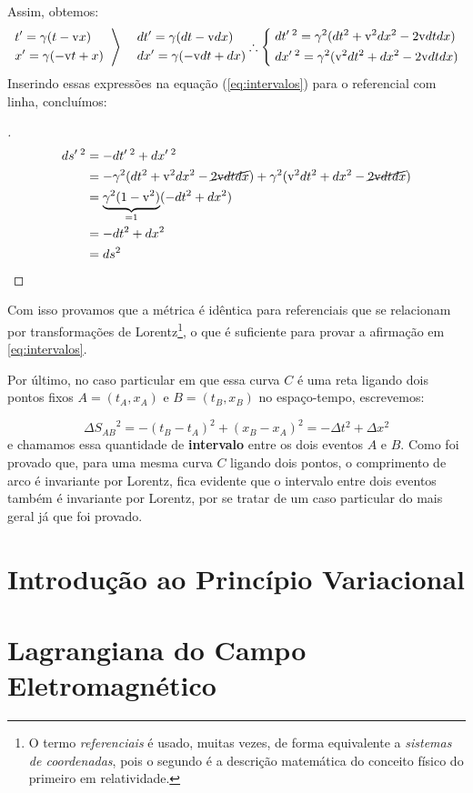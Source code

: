 \documentclass[12pt,a4paper]{article}
\begin{document}
Assim, obtemos:
\[
  \left.
  \begin{aligned}
    &   t' = \gamma(t - \mathrm{v}x) \\
    &   x' = \gamma(-\mathrm{v}t + x) 
  \end{aligned}\;\;
  \right\rangle\;\;\;\;
  \begin{aligned}
    & dt' = \gamma(dt - \mathrm{v}dx)\\
    & dx' = \gamma(-\mathrm{v}dt +dx)
  \end{aligned}\\\\
  \therefore 
  \left\{\;
  \begin{aligned}
    & dt^{\prime\;2} = \gamma^2(dt^2 + \mathrm{v}^2dx^2 - 2\mathrm{v}dtdx)\\
    & dx^{\prime\;2} = \gamma^2(\mathrm{v}^2dt^2 + dx^2 - 2\mathrm{v}dtdx)
  \end{aligned}\right.
\]
Inserindo essas expressões na equação (\ref{eq:intervalos}) para o referencial com linha, concluímos:
\begin{proof}[]
  \begin{align}
    ds^{\prime\; 2} &= -dt^{\prime\; 2} + dx^{\prime\; 2} \nonumber \\
    &= -\gamma^2(dt^2 + \mathrm{v}^2dx^2 - \cancel{2\mathrm{v}dtdx}) + \gamma^2(\mathrm{v}^2dt^2 + dx^2 - \cancel{2\mathrm{v}dtdx}) \nonumber \\
    &=  \underbrace{\gamma^2 (1-\mathrm{v}^2)}_{= 1}(-dt^2 + dx^2) \nonumber\\
    &= -dt^2 + dx^2 \nonumber \\
    &= ds^2 \qedhere
  \end{align}
\end{proof}
Com isso provamos que a métrica é idêntica para referenciais que se relacionam por transformações de
Lorentz\footnote{O termo \textit{referenciais} é usado, muitas vezes, de forma equivalente a \textit{sistemas de coordenadas}, pois o segundo é a descrição matemática do conceito físico do primeiro em relatividade.},
o que é suficiente para provar a afirmação em \ref{eq:intervalos}.

Por último, no caso particular em que essa curva $C$ é uma reta ligando dois pontos fixos $A = (t_A,x_A)$ e $B=(t_B,x_B)$ no espaço-tempo,
escrevemos:

\begin{equation}
  {\Delta S_{AB}}^2 = -(t_B - t_A)^2 + (x_B - x_A)^2 = -\Delta t^2 + \Delta x^2
\end{equation}
e chamamos essa quantidade de \textbf{intervalo} entre os dois eventos $A$ e $B$. Como foi provado que, para uma mesma curva
$C$ ligando dois pontos, o comprimento de arco é invariante por Lorentz, fica evidente que o intervalo entre
dois eventos também é invariante por Lorentz, por se tratar de um caso particular do mais geral já que foi provado.
\section{Introdução ao Princípio Variacional}

\section{Lagrangiana do Campo Eletromagnético}

\newpage
\printbibliography
\end{document}
